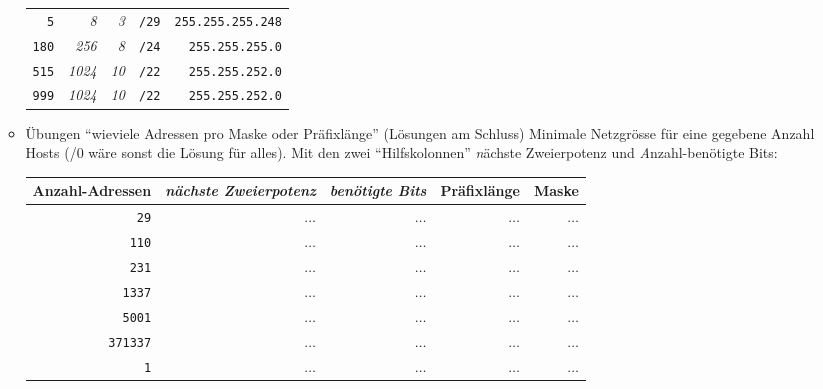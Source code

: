 \documentclass[a4paper,german]{scrartcl}
\begin{document}
\begin{itemize}
\begin{itemize}
\begin{center}
\begin{tabular}{rrrrr}
           \hline
           \texttt{5}           &      \emph{8}                & \emph{3}                      &       \texttt{/29}     & \texttt{255.255.255.248} \\
           \texttt{180}          &      \emph{256}               & \emph{8}                      &       \texttt{/24}     & \texttt{255.255.255.0} \\
           \texttt{515}         &      \emph{1024}              & \emph{10}                     &       \texttt{/22}     & \texttt{255.255.252.0} \\
           \texttt{999}          &      \emph{1024}               & \emph{10}                      &       \texttt{/22}     & \texttt{255.255.252.0} \\
         \end{tabular}
       \end{center}

     \item \"Ubungen ``wieviele Adressen pro Maske oder Pr\"afixl\"ange'' (L\"osungen am Schluss)
       Minimale Netzgr\"osse f\"ur eine gegebene Anzahl Hosts (/0 w\"are sonst die L\"osung f\"ur alles).
       Mit den zwei ``Hilfskolonnen'' {\emph n\"achste Zweierpotenz} und {\emph Anzahl-ben\"otigte Bits}:
 
       \begin{center}
         \begin{tabular}{rrrrr}
           Anzahl-Adressen & \emph{n\"achste Zweierpotenz} & \emph{ben\"otigte Bits} & Pr\"afixl\"ange        & Maske \\
           \hline
           \texttt{29}           &      $\ldots$         & $\ldots$                    &       $\ldots$     & $\ldots$ \\
           \texttt{110}          &      $\ldots$         & $\ldots$                    &       $\ldots$     & $\ldots$ \\
           \texttt{231}          &      $\ldots$         & $\ldots$                    &       $\ldots$     & $\ldots$ \\
           \texttt{1337}         &      $\ldots$         & $\ldots$                    &       $\ldots$     & $\ldots$ \\
           \texttt{5001}         &      $\ldots$         & $\ldots$                    &       $\ldots$     & $\ldots$ \\
           \texttt{371337}       &      $\ldots$         & $\ldots$                    &       $\ldots$     & $\ldots$ \\
           \texttt{1}            &      $\ldots$         & $\ldots$                    &       $\ldots$     & $\ldots$ \\
         \end{tabular}
       \end{center}
   \end{itemize}    
 \vspace{0.5cm}    
 
\end{itemize}
\end{document}
